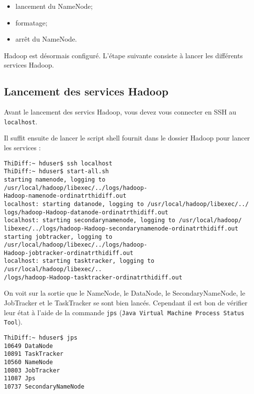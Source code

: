 \begin{itemize}
\item lancement du NameNode;
\item formatage;
\item arrêt du NameNode.
\end{itemize}

\par Hadoop est désormais configuré. L'étape suivante consiste à lancer les différents services Hadoop.

\subsection{Lancement des services Hadoop}
\label{sec:start-1.x-demons}

\par Avant le lancement des servics Hadoop, vous devez vous connecter en SSH au \texttt{localhost}.

\par Il suffit ensuite de lancer le script shell fournit dans le dossier Hadoop pour lancer les services :

\begin{verbatim}
ThiDiff:~ hduser$ ssh localhost
ThiDiff:~ hduser$ start-all.sh
starting namenode, logging to /usr/local/hadoop/libexec/../logs/hadoop-
Hadoop-namenode-ordinatrthidiff.out
localhost: starting datanode, logging to /usr/local/hadoop/libexec/../
logs/hadoop-Hadoop-datanode-ordinatrthidiff.out
localhost: starting secondarynamenode, logging to /usr/local/hadoop/
libexec/../logs/hadoop-Hadoop-secondarynamenode-ordinatrthidiff.out
starting jobtracker, logging to /usr/local/hadoop/libexec/../logs/hadoop-
Hadoop-jobtracker-ordinatrthidiff.out
localhost: starting tasktracker, logging to /usr/local/hadoop/libexec/..
/logs/hadoop-Hadoop-tasktracker-ordinatrthidiff.out
\end{verbatim}

\par On voit sur la sortie que le NameNode, le DataNode, le SecondaryNameNode, le JobTracker et le TaskTracker se sont bien lancés. Cependant il est bon de vérifier leur état à l'aide de la commande \texttt{jps} (\texttt{Java Virtual Machine Process Status Tool}).

\begin{verbatim}
ThiDiff:~ hduser$ jps
10649 DataNode
10891 TaskTracker
10560 NameNode
10803 JobTracker
11087 Jps
10737 SecondaryNameNode
\end{verbatim}


